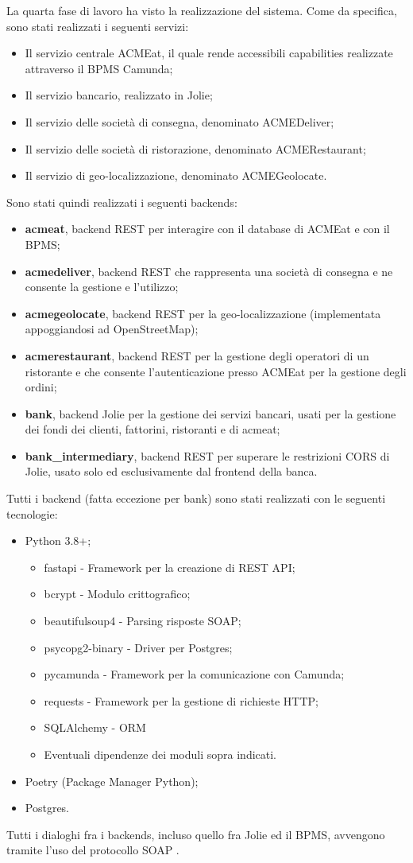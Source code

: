 \documentclass[11pt]{article} %
\begin{document}
La quarta fase di lavoro ha visto la realizzazione del sistema. Come da specifica, sono stati realizzati i seguenti servizi:
\begin{itemize}
\item Il servizio centrale ACMEat, il quale rende accessibili capabilities realizzate attraverso il BPMS Camunda;
\item Il servizio bancario, realizzato in Jolie;
\item Il servizio delle società di consegna, denominato ACMEDeliver;
\item Il servizio delle società di ristorazione, denominato ACMERestaurant;
\item Il servizio di geo-localizzazione, denominato ACMEGeolocate.
\end{itemize}
Sono stati quindi realizzati i seguenti backends:
\begin{itemize}
\item \textbf{acmeat}, backend REST per interagire con il database di ACMEat e con il BPMS;
\item \textbf{acmedeliver}, backend REST che rappresenta una società di consegna e ne consente la gestione e l'utilizzo;
\item \textbf{acmegeolocate}, backend REST per la geo-localizzazione (implementata appoggiandosi ad OpenStreetMap);
\item \textbf{acmerestaurant}, backend REST per la gestione degli operatori di un ristorante e che consente l'autenticazione presso ACMEat per la gestione degli ordini;
\item \textbf{bank}, backend Jolie per la gestione dei servizi bancari, usati per la gestione dei fondi dei clienti, fattorini, ristoranti e di acmeat;
\item \textbf{bank\_intermediary}, backend REST per superare le restrizioni CORS di Jolie, usato solo ed esclusivamente dal frontend della banca.
\end{itemize}
Tutti i backend (fatta eccezione per bank) sono stati realizzati con le seguenti tecnologie:
\begin{itemize}
\item Python 3.8+;
\begin{itemize}
\item fastapi - Framework per la creazione di REST API;
\item bcrypt - Modulo crittografico;
\item beautifulsoup4 - Parsing risposte SOAP;
\item psycopg2-binary - Driver per Postgres;
\item pycamunda - Framework per la comunicazione con Camunda;
\item requests - Framework per la gestione di richieste HTTP;
\item SQLAlchemy - ORM
\item Eventuali dipendenze dei moduli sopra indicati.
\end{itemize}
\item Poetry (Package Manager Python);
\item Postgres.
\end{itemize}
Tutti i dialoghi fra i backends, incluso quello fra Jolie ed il BPMS, avvengono tramite l'uso del protocollo SOAP .
\end{document}
